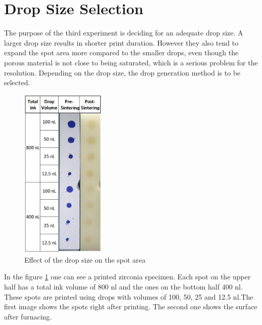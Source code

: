 \section{Drop Size Selection}
The purpose of the third experiment is deciding for an adequate drop size. A larger drop size results in shorter print duration. However they also tend to expand the spot area more compared to the smaller drops, even though the porous material is not close to being saturated, which is a serious problem for the resolution. Depending on the drop size, the drop generation method is to be selected.
 
\bigskip
\begin{figure}[H]
	\centering
	\includegraphics[width=0.36\textwidth]{grafiken/DropSize.jpg}
	\caption{Effect of the drop size on the spot area}
	\label{fig:DropSize}
\end{figure} 
\bigskip

In the figure \ref{fig:DropSize} one can see a printed zirconia specimen. Each spot on the upper half has a total ink volume of 800 nl and the ones on the bottom half 400 nl. These spots are printed using drops with volumes of 100, 50, 25 and 12.5 nl.The first image shows the spots right after printing. The second one shows the surface after furnacing.

\bigskip

